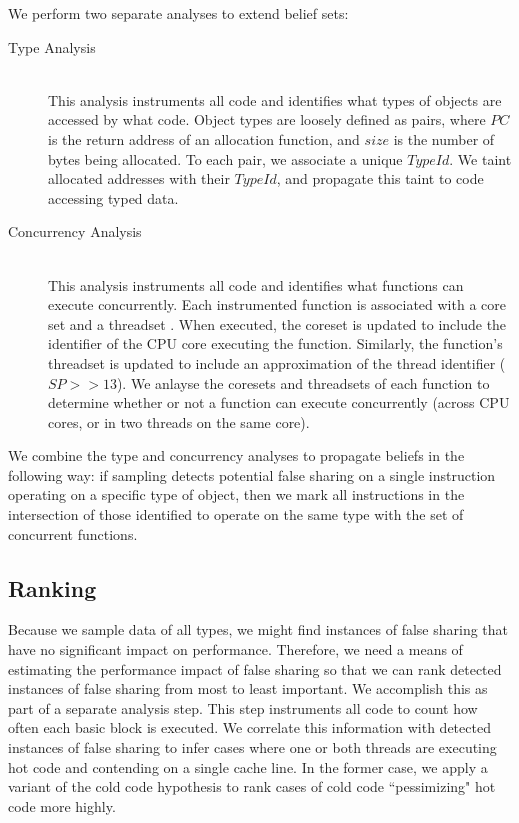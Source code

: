 \documentclass{sig-alternate}
\begin{document}
\newcommand\TypeId{$TypeId$}

We perform two separate analyses to extend belief sets: \begin{description}
\item[Type Analysis] \hfill \\
This analysis instruments all code and identifies what types of objects are accessed by what code. Object types are loosely
defined as \TypeIdPair{} pairs, where $PC$ is the return address of an allocation function, and $size$ is the number of bytes
being allocated. To each \TypeIdPair pair, we associate a unique \TypeId{}. We taint \cite{AddressWatchpoints} allocated
addresses with their \TypeId{}, and propagate this taint to code accessing typed data.

\item[Concurrency Analysis] \hfill \\
This analysis instruments all code and identifies what functions can execute concurrently. Each instrumented function
is associated with a core set and a threadset \cite{DrContention}. When executed, the coreset is updated to include the
identifier of the CPU core executing the function. Similarly, the function's threadset is updated to include an approximation
of the thread identifier ($SP >> 13$). We anlayse the coresets and threadsets of each function to determine whether or
not a function can execute concurrently (across CPU cores, or in two threads on the same core).

\end{description}

We combine the type and concurrency analyses to propagate beliefs in the following way: if sampling detects potential
false sharing on a single instruction operating on a specific type of object, then we mark all instructions in the intersection
of those identified to operate on the same type with the set of concurrent functions.

\subsection{Ranking}\label{sec:ranking}

Because we sample data of all types, we might find instances of false sharing that have no significant impact on performance.
Therefore, we need a means of estimating the performance impact of false sharing so that we can rank detected instances of
false sharing from most to least important. We accomplish this as part of a separate analysis step. This step
instruments all code to count how often each basic block is executed. We correlate this information with detected
instances of false sharing to infer cases where one or both threads are executing hot code and contending on a single
cache line. In the former case, we apply a variant of the cold code hypothesis \cite{LiteRace} to rank cases of cold
code ``pessimizing" hot code more highly.
\end{document}
